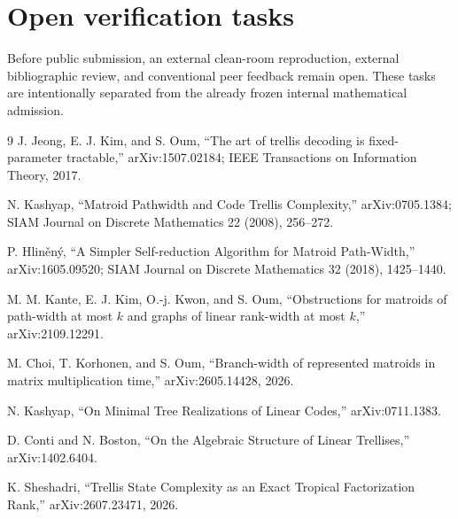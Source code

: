 \documentclass[11pt]{article}
\begin{document}
\section{Open verification tasks}
Before public submission, an external clean-room reproduction, external bibliographic review, and conventional peer feedback remain open. These tasks are intentionally separated from the already frozen internal mathematical admission.

\begin{thebibliography}{9}
J. Jeong, E. J. Kim, and S. Oum,
``The art of trellis decoding is fixed-parameter tractable,''
arXiv:1507.02184; IEEE Transactions on Information Theory, 2017.

N. Kashyap,
``Matroid Pathwidth and Code Trellis Complexity,''
arXiv:0705.1384; SIAM Journal on Discrete Mathematics 22 (2008), 256--272.

P. Hlin\v{e}n\'y,
``A Simpler Self-reduction Algorithm for Matroid Path-Width,''
arXiv:1605.09520; SIAM Journal on Discrete Mathematics 32 (2018), 1425--1440.

M. M. Kante, E. J. Kim, O.-j. Kwon, and S. Oum,
``Obstructions for matroids of path-width at most $k$ and graphs of linear rank-width at most $k$,''
arXiv:2109.12291.

M. Choi, T. Korhonen, and S. Oum,
``Branch-width of represented matroids in matrix multiplication time,''
arXiv:2605.14428, 2026.

N. Kashyap,
``On Minimal Tree Realizations of Linear Codes,''
arXiv:0711.1383.

D. Conti and N. Boston,
``On the Algebraic Structure of Linear Trellises,''
arXiv:1402.6404.

K. Sheshadri,
``Trellis State Complexity as an Exact Tropical Factorization Rank,''
arXiv:2607.23471, 2026.
\end{thebibliography}
\end{document}
